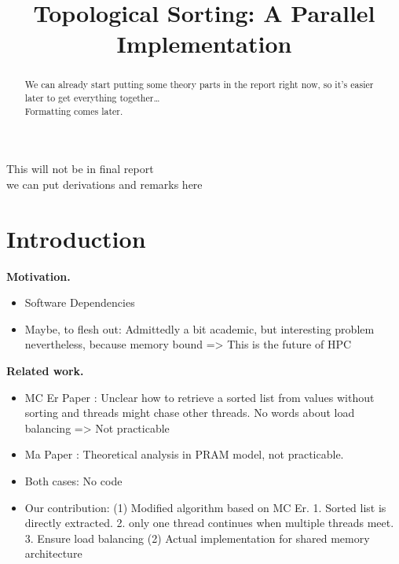 \documentclass[letterpaper]{article}
\title{Topological Sorting: A Parallel Implementation}
\newcommand{\mypar}[1]{{\bf #1.}}
\begin{document}
\maketitle

\begin{abstract}
 We can already start putting some theory parts in the report right now, so it's easier later to get everything together\ldots \\
Formatting comes later.
\end{abstract}


\begin{invisible}
	This will not be in final report \\
	we can put derivations and remarks here
\end{invisible}

\section{Introduction}\label{sec:intro}

\mypar{Motivation}
\begin{invisible}
  \begin{itemize}
  \item Software Dependencies
  \item Maybe, to flesh out: Admittedly a bit academic, but interesting problem nevertheless, because memory bound => This is the future of HPC
  \end{itemize}
\end{invisible}


\mypar{Related work} 
\begin{invisible}
  \begin{itemize}
  \item MC Er Paper \cite{er1983parallel}: Unclear how to retrieve a sorted list from values without sorting and threads might chase other threads. No words about load balancing => Not practicable
  \item Ma Paper \cite{ma1997efficient}: Theoretical analysis in PRAM model, not practicable.
  \item Both cases: No code
  \item Our contribution: (1) Modified algorithm based on MC Er. 1. Sorted list is directly extracted. 2. only one thread continues when multiple threads meet. 3. Ensure load balancing
                          (2) Actual implementation for shared memory architecture
  \end{itemize}
\end{invisible}
\end{document}
